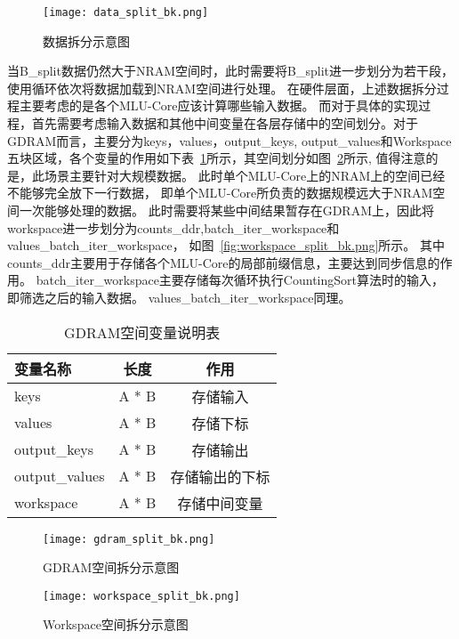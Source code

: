 \begin{figure}[ht]
    \centering
    \texttt{[image: data\_split\_bk.png]}
    \caption{数据拆分示意图}
    \label{fig:data_split_bk}
\end{figure}
当B\_split数据仍然大于NRAM空间时，此时需要将B\_split进一步划分为若干段，
使用循环依次将数据加载到NRAM空间进行处理。
在硬件层面，上述数据拆分过程主要考虑的是各个MLU-Core应该计算哪些输入数据。
而对于具体的实现过程，首先需要考虑输入数据和其他中间变量在各层存储中的空间划分。对于GDRAM而言，主要分为keys，values，output\_keys,
output\_values和Workspace五块区域，各个变量的作用如下表~\ref{tab:gdram_var_bk}所示，其空间划分如图~\ref{fig:gdram_split_bk}所示,
值得注意的是，此场景主要针对大规模数据。
此时单个MLU-Core上的NRAM上的空间已经不能够完全放下一行数据，
即单个MLU-Core所负责的数据规模远大于NRAM空间一次能够处理的数据。
此时需要将某些中间结果暂存在GDRAM上，因此将workspace进一步划分为counts\_ddr,batch\_iter\_workspace和values\_batch\_iter\_workspace，
如图~\ref{fig:workspace_split_bk.png}所示。
其中counts\_ddr主要用于存储各个MLU-Core的局部前缀信息，主要达到同步信息的作用。
batch\_iter\_workspace主要存储每次循环执行CountingSort算法时的输入，即筛选之后的输入数据。
values\_batch\_iter\_workspace同理。
\begin{table}
    \caption{GDRAM空间变量说明表}
    \centering
    \begin{tabular}{lcc}
    \toprule
    变量名称 & 长度 & 作用 \\
    \midrule
    keys & A * B & 存储输入 \\
    values & A * B & 存储下标 \\
    output\_keys & A * B & 存储输出 \\
    output\_values & A * B & 存储输出的下标 \\
    workspace & A * B & 存储中间变量 \\
    \bottomrule
    \end{tabular}
    \label{tab:gdram_var_bk}
\end{table}

\begin{figure}[ht]
    \centering
    \texttt{[image: gdram\_split\_bk.png]}
    \caption{GDRAM空间拆分示意图}
    \label{fig:gdram_split_bk}
\end{figure}

\begin{figure}[ht]
    \centering
    \texttt{[image: workspace\_split\_bk.png]}
    \caption{Workspace空间拆分示意图}
    \label{fig:workspace_split_bk}
\end{figure}

